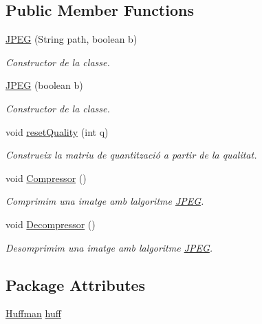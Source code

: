\subsection*{Public Member Functions}
\begin{DoxyCompactItemize}
\item 
\hyperlink{classdomini_1_1algorithm_1_1JPEG_ac489916de8505f11b6e29c7206baf3c7}{J\+P\+EG} (String path, boolean b)
\begin{DoxyCompactList}\small\item\em Constructor de la classe. \end{DoxyCompactList}\item 
\hyperlink{classdomini_1_1algorithm_1_1JPEG_ade39a15f3c5722b4975746fcee6ad364}{J\+P\+EG} (boolean b)
\begin{DoxyCompactList}\small\item\em Constructor de la classe. \end{DoxyCompactList}\item 
void \hyperlink{classdomini_1_1algorithm_1_1JPEG_a860d6166ef8edc40b0ffb61942589e5d}{reset\+Quality} (int q)
\begin{DoxyCompactList}\small\item\em Construeix la matriu de quantització a partir de la qualitat. \end{DoxyCompactList}\item 
void \hyperlink{classdomini_1_1algorithm_1_1JPEG_a753bf49f2c8bde9e54464b21a1bcb2d8}{Compressor} ()
\begin{DoxyCompactList}\small\item\em Comprimim una imatge amb l\textquotesingle{}algoritme \hyperlink{classdomini_1_1algorithm_1_1JPEG}{J\+P\+EG}. \end{DoxyCompactList}\item 
void \hyperlink{classdomini_1_1algorithm_1_1JPEG_accca347e84e41b254d1f4a7bbdf2201a}{Decompressor} ()
\begin{DoxyCompactList}\small\item\em Desomprimim una imatge amb l\textquotesingle{}algoritme \hyperlink{classdomini_1_1algorithm_1_1JPEG}{J\+P\+EG}. \end{DoxyCompactList}\end{DoxyCompactItemize}
\subsection*{Package Attributes}
\begin{DoxyCompactItemize}
\item 
\hyperlink{classHuffman}{Huffman} \hyperlink{classdomini_1_1algorithm_1_1JPEG_aacc6445baa7819e3f9139ffb78e0b8f4}{huff}
\end{DoxyCompactItemize}
